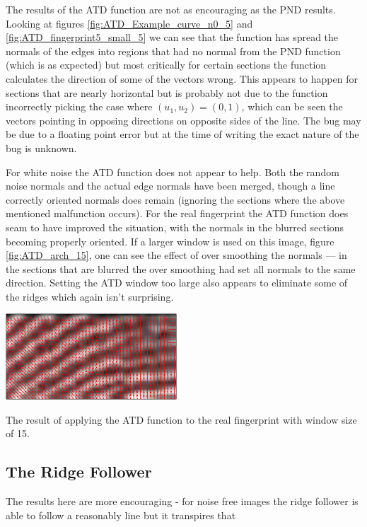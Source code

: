 \documentclass[11pt,a4paper]{article}
\makeatletter
\newenvironment{figurehere}
    {\def\@captype{figure}}
    {}
\makeatother
\begin{document}
\begin{multicols}{2}
		The results of the ATD function are not as encouraging as the PND results. Looking at figures \ref{fig:ATD_Example_curve_n0_5} and \ref{fig:ATD_fingerprint5_small_5} we can see that the function has spread the normals of the edges into regions that had no normal from the PND function (which is as expected) but most critically for certain sections the function calculates the direction of some of the vectors wrong. This appears to happen for sections that are nearly horizontal but is probably not due to the function incorrectly picking the case where $(u_1, u_2) = (0, 1)$, which can be seen the vectors pointing in opposing directions on opposite sides of the line. The bug may be due to a floating point error but at the time of writing the exact nature of the bug is unknown.

		For white noise the ATD function does not appear to help. Both the random noise normals and the actual edge normals have been merged, though a line correctly oriented normals does remain (ignoring the sections where the above mentioned malfunction occurs). For the real fingerprint the ATD function does seam to have improved the situation, with the normals in the blurred sections becoming properly oriented. If a larger window is used on this image, figure \ref{fig:ATD_arch_15}, one can see the effect of over smoothing the normals --- in the sections that are blurred the over smoothing had set all normals to the same direction. Setting the ATD window too large also appears to eliminate some of the ridges which again isn't surprising.

\begin{figurehere}
\centering
\includegraphics[width = 0.48\textwidth]{ATD_arch_15}
\caption{The result of applying the ATD function to the real fingerprint with window size of 15.}
\label{fig:ATD_arch_15}
\end{figurehere}

	\subsection{The Ridge Follower}
		The results here are more encouraging - for noise free images the ridge follower is able to follow a reasonably line but it transpires that 


\end{multicols}
\end{document}
